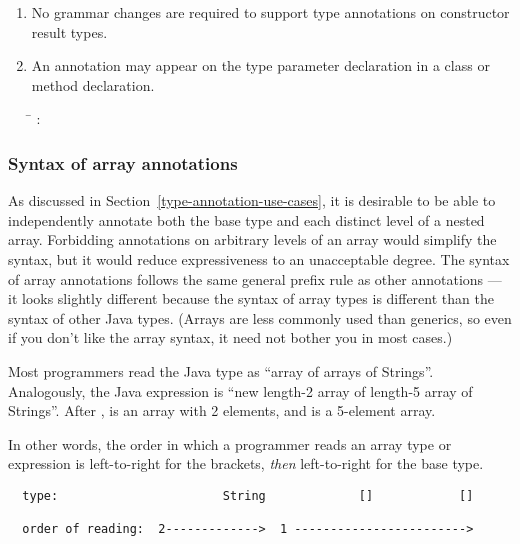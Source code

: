 \documentclass[10pt]{article}
\begin{document}
\begin{enumerate}
\item
No grammar changes are required to support type annotations on constructor
result types.

\item
An annotation may appear on the type parameter
declaration in a class or method declaration.

\begin{tabbing}
\qquad \= \kill
{}: \\
\qquad            {}  
\end{tabbing}

\end{enumerate}




\subsubsection{Syntax of array annotations\label{array-syntax}}

As discussed in Section~\ref{type-annotation-use-cases}, it is
desirable to be able to independently annotate both the base type and
each distinct level of a nested array.
Forbidding annotations on arbitrary levels of an array would simplify the
syntax, but it would reduce expressiveness to an unacceptable degree.
The syntax of array annotations follows the same general prefix rule as
other annotations --- it looks slightly different because the syntax
of array types is different than the syntax of other Java types.
(Arrays are less commonly used than generics, so even if you don't like the
array syntax, it need not bother you in most cases.)

Most programmers read the Java type  as
``array of arrays of Strings''.  Analogously, the Java expression
 is ``new length-2 array of length-5 array of Strings''.
After ,  is an array with
2 elements, and  is a 5-element array.

In other words, the order in which a programmer reads an array type or
expression is left-to-right for the
brackets, \emph{then} left-to-right for the base type.

\begin{Verbatim}
  type:                       String             []            []

  order of reading:  2------------->  1 ------------------------>
\end{Verbatim}
\end{document}
